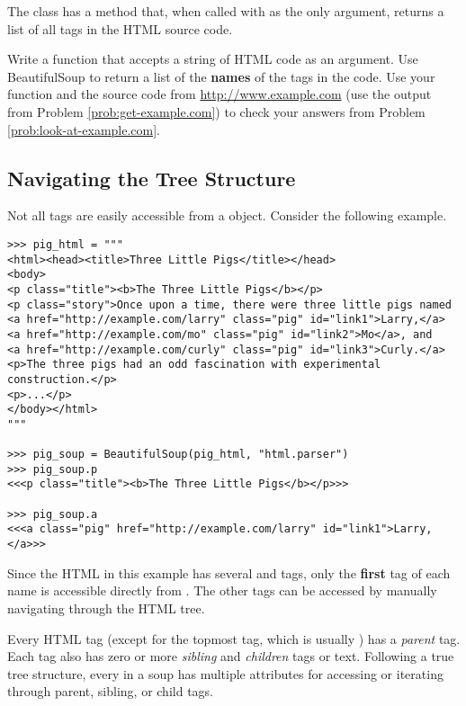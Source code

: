 \begin{problem} %
The  class has a  method that, when called with  as the only argument, returns a list of all tags in the HTML source code.

Write a function that accepts a string of HTML code as an argument.
Use BeautifulSoup to return a list of the \textbf{names} of the tags in the code.
Use your function and the source code from \url{http://www.example.com} (use the output from Problem \ref{prob:get-example.com}) to check your answers from Problem \ref{prob:look-at-example.com}.
\end{problem}

\subsection*{Navigating the Tree Structure} %

Not all tags are easily accessible from a  object.
Consider the following example.

\begin{lstlisting}
>>> pig_html = """
<html><head><title>Three Little Pigs</title></head>
<body>
<p class="title"><b>The Three Little Pigs</b></p>
<p class="story">Once upon a time, there were three little pigs named
<a href="http://example.com/larry" class="pig" id="link1">Larry,</a>
<a href="http://example.com/mo" class="pig" id="link2">Mo</a>, and
<a href="http://example.com/curly" class="pig" id="link3">Curly.</a>
<p>The three pigs had an odd fascination with experimental construction.</p>
<p>...</p>
</body></html>
"""

>>> pig_soup = BeautifulSoup(pig_html, "html.parser")
>>> pig_soup.p
<<<p class="title"><b>The Three Little Pigs</b></p>>>

>>> pig_soup.a
<<<a class="pig" href="http://example.com/larry" id="link1">Larry,</a>>>
\end{lstlisting}

Since the HTML in this example has several  and  tags, only the \textbf{first} tag of each name is accessible directly from .
The other tags can be accessed by manually navigating through the HTML tree.

Every HTML tag (except for the topmost tag, which is usually ) has a \emph{parent} tag.
Each tag also has zero or more \emph{sibling} and \emph{children} tags or text.
Following a true tree structure, every  in a soup has multiple attributes for accessing or iterating through parent, sibling, or child tags.

